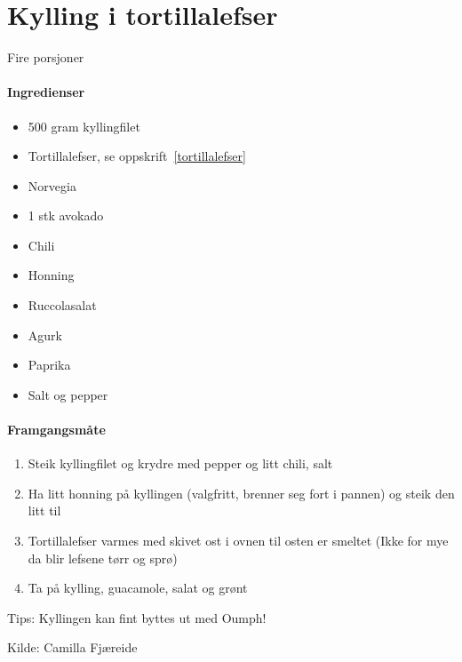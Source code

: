 \section{Kylling i tortillalefser}
\label{kyllingtortilla}

Fire porsjoner

\paragraph{Ingredienser}
\begin{itemize}[noitemsep]
	\item 500 gram kyllingfilet
		\item Tortillalefser, se oppskrift~\ref{tortillalefser}
		\item Norvegia
		\item 1 stk avokado
		\item Chili
		\item Honning
		\item Ruccolasalat
		\item Agurk
		\item Paprika
		\item Salt og pepper
\end{itemize}

\paragraph{Framgangsmåte}
\begin{enumerate}[noitemsep]
	\item Steik kyllingfilet og krydre med pepper og litt chili, salt
	\item Ha litt honning på kyllingen (valgfritt, brenner seg fort i pannen) og steik den litt til
	\item Tortillalefser varmes med skivet ost i ovnen til osten er smeltet (Ikke for mye da blir lefsene tørr og sprø)
	\item Ta på kylling, guacamole, salat og grønt
\end{enumerate}

Tips: Kyllingen kan fint byttes ut med Oumph!

Kilde: Camilla Fjæreide
